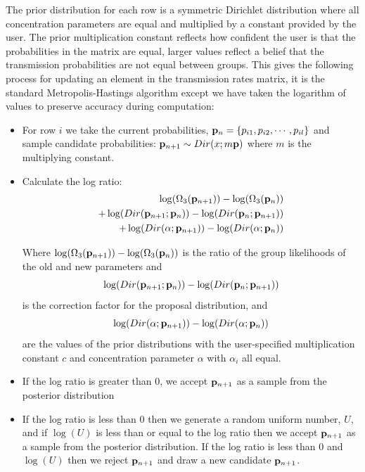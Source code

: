 \documentclass[11pt,a4paper]{report}
\begin{document}
The prior distribution for each row is a symmetric Dirichlet distribution where all concentration parameters are equal and multiplied by a constant provided by the user. The prior multiplication constant reflects how confident the user is that the probabilities in the matrix are equal, larger values reflect a belief that the transmission probabilities are not equal between groups. This gives the following process for updating an element in the transmission rates matrix, it is the standard Metropolis-Hastings algorithm except we have taken the logarithm of values to preserve accuracy during computation:
\begin{itemize}
\item For row $i$ we take the current probabilities, ${\bf p}_{n} =  \{p_{i1},p_{i2}, \cdots,p_{il}\}$ and sample candidate probabilities: ${\bf p}_{n+1} \sim Dir(x;m{\bf p})$ where $m$ is the multiplying constant.
\item Calculate the log ratio: 
\begin{equation}
\begin{split}
\log(\Omega_3({\bf p}_{n+1})) - \log(\Omega_3({\bf p}_{n})) \\ +  \log(Dir({\bf p}_{n+1};{\bf p}_{n})) - \log(Dir({\bf p}_{n};{\bf p}_{n+1})) \\ + \log(Dir({\bf \alpha};{\bf p}_{n+1})) - \log(Dir({\bf \alpha};{\bf p}_{n}))
\end{split}
\end{equation}

Where $\log(\Omega_3({\bf p}_{n+1})) - \log(\Omega_3({\bf p}_{n}))$ is the ratio of the group likelihoods of the old and new parameters and
 \[ \log(Dir({\bf p}_{n+1};{\bf p}_{n})) - \log(Dir({\bf p}_{n};{\bf p}_{n+1})) \]
is the correction factor for the proposal distribution, and
\[ \log(Dir({\bf \alpha};{\bf p}_{n+1})) - \log(Dir({\bf \alpha};{\bf p}_{n}))\]
are the values of the prior distributions with the user-specified multiplication constant $c$ and concentration parameter $\alpha$ with $\alpha_i$ all equal.
\item If  the log ratio is greater than 0, we accept ${\bf p}_{n+1}$ as a sample from the posterior distribution
\item If the log ratio is less than 0 then we generate a random uniform number, $U$, and if $\log(U)$ is less than or equal to the log ratio then we accept ${\bf p}_{n+1}$ as a sample from the posterior distribution. If the log ratio is less than 0 and $\log(U)$ then we reject ${\bf p}_{n+1}$ and draw a new candidate ${\bf p}_{n+1}$.
\end{itemize}
\end{document}
